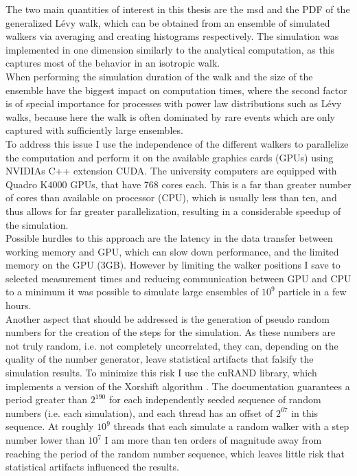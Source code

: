 The two main quantities of interest in this thesis are the \gls{msd} and the \gls{PDF} of the generalized L\'evy walk, which can be obtained from an ensemble of simulated walkers via averaging and creating histograms respectively. The simulation was implemented in one dimension similarly to the analytical computation, as this captures most of the behavior in an isotropic walk. \\
When performing the simulation duration of the walk and the size of the ensemble have the biggest impact on computation times, where the second factor is of special importance for processes with power law distributions such as L\'evy walks, because here the walk is often dominated by rare events which are only captured with sufficiently large ensembles. \\
To address this issue I use the independence of the different walkers to parallelize the computation and perform it on the available graphics cards (GPUs) using NVIDIAs C++ extension CUDA. The university computers are equipped with Quadro K4000 GPUs, that have 768 cores each. This is a far than greater number of cores than available on processor (CPU), which is usually less than ten, and thus allows for far greater parallelization, resulting in a considerable speedup of the simulation.  \\
Possible hurdles to this approach are the latency in the data transfer between working memory and GPU, which can slow down performance, and the limited memory on the GPU (3GB). However by limiting the walker positions I save to selected measurement times and reducing communication between GPU and CPU to a minimum it was possible to simulate large ensembles of $10^9$ particle in a few hours. \\

Another aspect that should be addressed is the generation of pseudo random numbers for the creation of the steps for the simulation. As these numbers are not truly random, i.e. not completely uncorrelated, they can, depending on the quality of the number generator, leave statistical artifacts that falsify the simulation results. To minimize this risk I use the cuRAND library, which implements a version of the Xorshift algorithm \cite{marsaglia2003xorshift}. The documentation guarantees a period greater than $2^{190}$ for each independently seeded sequence of random numbers (i.e. each simulation), and each thread has an offset of $2^{67}$ in this sequence. At roughly $10^{9}$ threads that each simulate a random walker with a step number lower than $10^{7}$ I am more than ten orders of magnitude away from reaching the period of the random number sequence, which leaves little risk that statistical artifacts influenced the results.
